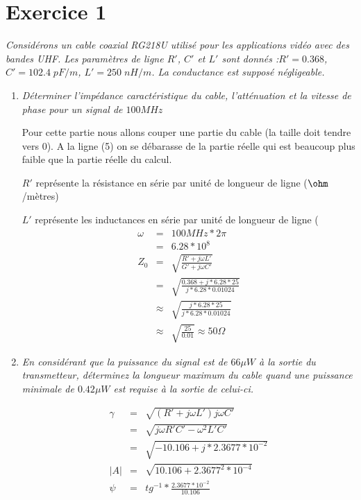 \documentclass[a4paper,11pt,onecolumn]{article}
\begin{document}
\section{Exercice 1}
	\textit{Considérons un cable coaxial RG218\/U utilisé pour les
	applications vidéo avec des bandes UHF. Les paramètres de ligne
$R'$, $C'$ et $L'$ sont donnés :$R' = 0.368$, $C'=102.4 \;pF/m$, $L'=250 \;nH/m$. La conductance est supposé négligeable.}
	\begin{enumerate}
		\item \textit{Déterminer l'impédance caractéristique du cable, l'atténuation et la vitesse de phase pour un signal de $100 MHz$}

		\begin{framed}
		Pour cette partie nous allons couper une partie du cable (la
		taille doit tendre vers 0). A la ligne (5) on se débarasse de la
		partie réelle qui est beaucoup plus faible que la partie réelle
		du calcul.

		$R'$ représente la résistance en série par unité de longueur de
		ligne ($\ohm$/mètres)

		$L'$ représente les inductances en série par unité de longueur
		de ligne (
		\begin{eqnarray*}
			\omega &=&100MHz * 2\pi\\
			&=& 6.28*10^8\\
			Z_0 &=& \sqrt{\frac{R'+j\omega L'}{G' + j\omega C'}}\\
			&=& \sqrt{\frac{0.368 + j * 6.28 * 25}{j*6.28 * 0.01024}} \\
			&\approx& \sqrt{\frac{j * 6.28 * 25}{j*6.28 * 0.01024}}\\
			&\approx& \sqrt{\frac{25}{0.01}} \approx 50 \Omega
		\end{eqnarray*}
		\end{framed}
	
		\item \textit{En considérant que la puissance du signal est de $66\mu W$ à la sortie du transmetteur, déterminez la longueur maximum du cable quand une puissance minimale de $0.42\mu W$ est requise à la sortie de celui-ci.}
		\begin{framed}
		\begin{eqnarray*}
			\gamma &=& \sqrt{(R' + j\omega L')j \omega C'} \\
			&=& \sqrt{j\omega R' C' - \omega^2 L' C'} \\
			&=& \sqrt{-10.106 + j*2.3677 * 10^{-2}} \\
			|A| &=& \sqrt{10.106+2.3677^2*10^{-4}} \\
			\psi &=& tg^{-1} * \frac{2.3677*10^{-2}}{10.106}
		\end{eqnarray*}
		\end{framed}
			
	\end{enumerate}
\end{document}
